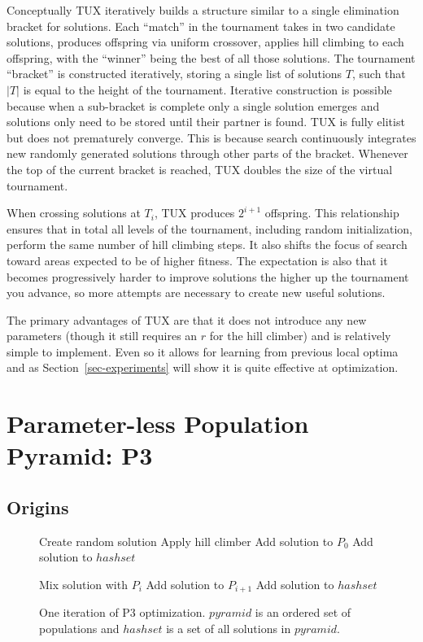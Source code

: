 \documentclass{sig-alternate}
\begin{document}
Conceptually TUX iteratively builds a structure similar to a single elimination
bracket for solutions. Each ``match'' in the tournament takes in two candidate solutions,
produces offspring via uniform crossover, applies hill climbing to each offspring, with
the ``winner'' being the best of all those solutions. The tournament ``bracket'' is constructed
iteratively, storing a single list of solutions $T$, such that $|T|$ is equal to the height
of the tournament. Iterative construction is possible because when a sub-bracket is complete only a single solution
emerges and solutions only need to be stored until their partner is found.
TUX is fully elitist but does not prematurely converge. This is because search continuously
integrates new randomly generated solutions through other parts of the bracket. Whenever the
top of the current bracket is reached, TUX doubles the size of the virtual tournament.

When crossing solutions at $T_i$, TUX produces $2^{i+1}$ offspring. This relationship
ensures that in total all levels of the tournament, including random initialization,
perform the same number of hill climbing steps. It also shifts the focus of search toward
areas expected to be of higher fitness. The expectation is also that it becomes progressively
harder to improve solutions the higher up the tournament you advance, so more attempts
are necessary to create new useful solutions.

The primary advantages of TUX are that it does not introduce any new parameters (though it still
requires an $r$ for the hill climber) and is relatively simple to implement. Even so
it allows for learning from previous local optima and as Section~\ref{sec-experiments}
will show it is quite effective at optimization.

\section{Parameter-less Population Pyramid: P3}
\subsection{Origins}
\begin{figure}
  \begin{algorithmic}
    \State Create random solution
    \State Apply hill climber
      \State Add solution to $P_0$
      \State Add solution to $hashset$
    \EndIf

      \State Mix solution with $P_i$
          \State Add solution to $P_{i+1}$
          \State Add solution to $hashset$
        \EndIf
      \EndIf
    \EndFor
  \EndProcedure
\end{algorithmic}
  \caption{One iteration of P3 optimization. $pyramid$ is an
           ordered set of populations and $hashset$ is a set
           of all solutions in $pyramid$.}
  \label{fig-p3}
\end{figure}
\end{document}
